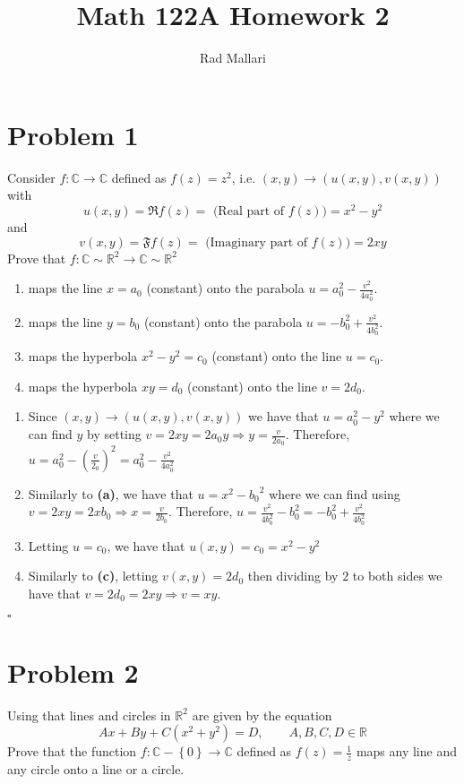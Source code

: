 \documentclass[12pt]{article}
\title{Math 122A Homework 2}
\author{Rad Mallari}
\newcommand{\C}{\mathbb{C}}
\newcommand{\R}{\mathbb{R}}
\newcommand{\set}[1]{\left\{ #1\right\}}
\newenvironment{proof}{\noindent{\bf Proof.}}{\hfill $\square$\medskip}
\begin{document}
\maketitle

\section{Problem 1}
Consider $f:\C\rightarrow\C$ defined as $f(z)=z^{2}$, i.e. $(x,y)\rightarrow(u(x,y),v(x,y))$ with
$$u(x,y)=\mathfrak{R} f(z)=\text{ (Real part of }f(z))=x^{2}-y^{2}$$
and
$$v(x,y)=\mathfrak{F} f(z)=\text{ (Imaginary part of }f(z))=2xy$$
Prove that $f:\C\sim\R^{2}\rightarrow\C\sim\R^{2}$
\begin{enumerate}[label=\textbf{(\alph*)}]
    \item maps the line $x=a_{0}$ (constant) onto the parabola $u=a_{0}^{2}-\frac{v^{2}}{4a_{0}^{2}}$.
    \item maps the line $y=b_{0}$ (constant) onto the parabola $u=-b_{0}^{2}+\frac{v^{2}}{4b_{0}^{2}}$.
    \item maps the hyperbola $x^{2}-y^{2}=c_{0}$ (constant) onto the line $u=c_{0}$.
    \item maps the hyperbola $xy=d_{0}$ (constant) onto the line $v=2d_{0}$.
\end{enumerate}

\begin{proof}
\begin{enumerate}[label=\textbf{(\alph*)}]
    \item Since $(x,y)\rightarrow(u(x,y),v(x,y))$ we have that $u=a_{0}^{2}-y^{2}$ where we can find $y$ by setting $v=2xy=2a_{0}y\Rightarrow y=\frac{v}{2a_{0}}$. Therefore, $u=a_{0}^{2}-(\frac{v}{2_{0}})^{2}=a_{0}^{2}-\frac{v^{2}}{4a_{0}^{2}}$
    \item Similarly to \textbf{(a)}, we have that $u=x^{2}-{b_{0}}^{2}$ where we can find using $v=2xy=2xb_{0}\Rightarrow x=\frac{v}{2b_{0}}$. Therefore, $u=\frac{v^{2}}{4b_{0}^{2}}-b_{0}^{2}=-b_{0}^{2}+\frac{v^{2}}{4b_{0}^{2}}$
    \item Letting $u=c_{0}$, we have that $u(x,y)=c_{0}=x^{2}-y^{2}$
    \item Similarly to \textbf{(c)}, letting $v(x,y)=2d_{0}$ then dividing by $2$ to both sides we have that $v=2d_{0}=2xy\Rightarrow v=xy$.
\end{enumerate}
\end{proof}


\section{Problem 2}
Using that lines and circles in $\R^{2}$ are given by the equation
$$Ax+By+C(x^{2}+y^{2})=D,\qquad A,B,C,D\in\R$$
Prove that the function $f:\C-\set{0}\rightarrow\C$ defined as $f(z)=\frac{1}{z}$ maps any line and any circle onto a line or a circle.
\end{document}
